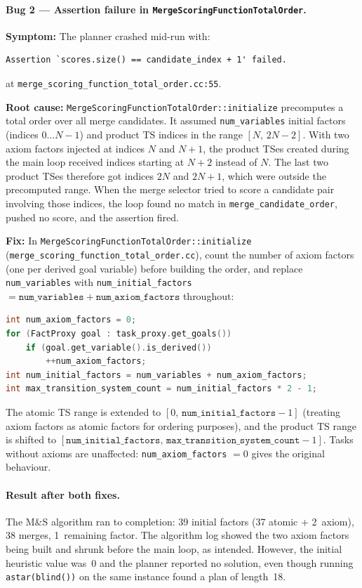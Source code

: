 \documentclass[11pt,a4paper]{article}
\begin{document}
\paragraph{Bug 2 — Assertion failure in \texttt{MergeScoringFunctionTotalOrder}.}
\textbf{Symptom:} The planner crashed mid-run with:
\begin{lstlisting}
Assertion `scores.size() == candidate_index + 1' failed.
\end{lstlisting}
at \texttt{merge\_scoring\_function\_total\_order.cc:55}.

\textbf{Root cause:} \texttt{MergeScoringFunctionTotalOrder::initialize}
precomputes a total order over all merge candidates.  It assumed
\texttt{num\_variables} initial factors (indices $0 \ldots N-1$) and product
TS indices in the range $[N,\, 2N-2]$.  With two axiom factors injected at
indices $N$ and $N+1$, the product TSes created during the main loop received
indices starting at $N+2$ instead of $N$.  The last two product TSes therefore
got indices $2N$ and $2N+1$, which were outside the precomputed range.  When
the merge selector tried to score a candidate pair involving those indices, the
loop found no match in \texttt{merge\_candidate\_order}, pushed no score, and
the assertion fired.

\textbf{Fix:} In \texttt{MergeScoringFunctionTotalOrder::initialize}
(\texttt{merge\_scoring\_function\_total\_order.cc}), count the number of
axiom factors (one per derived goal variable) before building the order, and
replace \texttt{num\_variables} with \texttt{num\_initial\_factors}
$= \texttt{num\_variables} + \texttt{num\_axiom\_factors}$ throughout:

\begin{lstlisting}[language=C++]
int num_axiom_factors = 0;
for (FactProxy goal : task_proxy.get_goals())
    if (goal.get_variable().is_derived())
        ++num_axiom_factors;
int num_initial_factors = num_variables + num_axiom_factors;
int max_transition_system_count = num_initial_factors * 2 - 1;
\end{lstlisting}

The atomic TS range is extended to $[0,\, \texttt{num\_initial\_factors} - 1]$
(treating axiom factors as atomic factors for ordering purposes), and the
product TS range is shifted to
$[\texttt{num\_initial\_factors},\, \texttt{max\_transition\_system\_count} - 1]$.
Tasks without axioms are unaffected: \texttt{num\_axiom\_factors} $= 0$ gives
the original behaviour.

\paragraph{Result after both fixes.}
The M\&S algorithm ran to completion: 39 initial factors (37 atomic + 2~axiom),
38 merges, 1~remaining factor.  The algorithm log showed the two axiom factors
being built and shrunk before the main loop, as intended.  However, the initial
heuristic value was~0 and the planner reported no solution, even though running
\texttt{astar(blind())} on the same instance found a plan of length~18.
\end{document}
